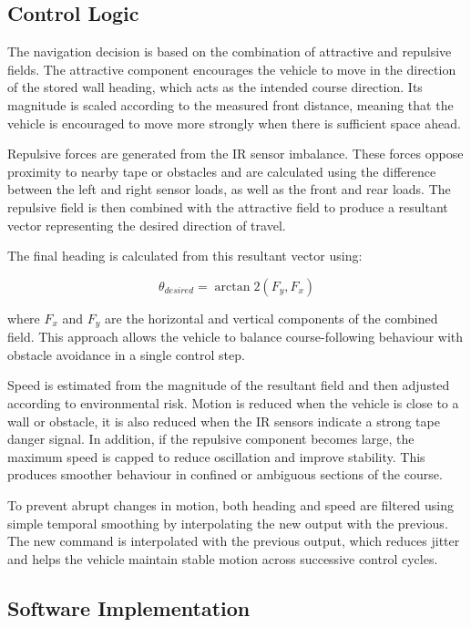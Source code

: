 \subsection{Control Logic}

The navigation decision is based on the combination of attractive and repulsive fields. The attractive component encourages the vehicle to move in the direction of the stored wall heading, which acts as the intended course direction. Its magnitude is scaled according to the measured front distance, meaning that the vehicle is encouraged to move more strongly when there is sufficient space ahead.

Repulsive forces are generated from the IR sensor imbalance. These forces oppose proximity to nearby tape or obstacles and are calculated using the difference between the left and right sensor loads, as well as the front and rear loads. The repulsive field is then combined with the attractive field to produce a resultant vector representing the desired direction of travel.

The final heading is calculated from this resultant vector using:

\[\theta_{desired} = \arctan2(F_y, F_x)\]

where $F_x$ and $F_y$ are the horizontal and vertical components of the combined field. This approach allows the vehicle to balance course-following behaviour with obstacle avoidance in a single control step.

Speed is estimated from the magnitude of the resultant field and then adjusted according to environmental risk. Motion is reduced when the vehicle is close to a wall or obstacle, it is also reduced when the IR sensors indicate a strong tape danger signal. In addition, if the repulsive component becomes large, the maximum speed is capped to reduce oscillation and improve stability. This produces smoother behaviour in confined or ambiguous sections of the course.

To prevent abrupt changes in motion, both heading and speed are filtered using simple temporal smoothing by interpolating the new output with the previous. The new command is interpolated with the previous output, which reduces jitter and helps the vehicle maintain stable motion across successive control cycles.

\subsection{Software Implementation}

